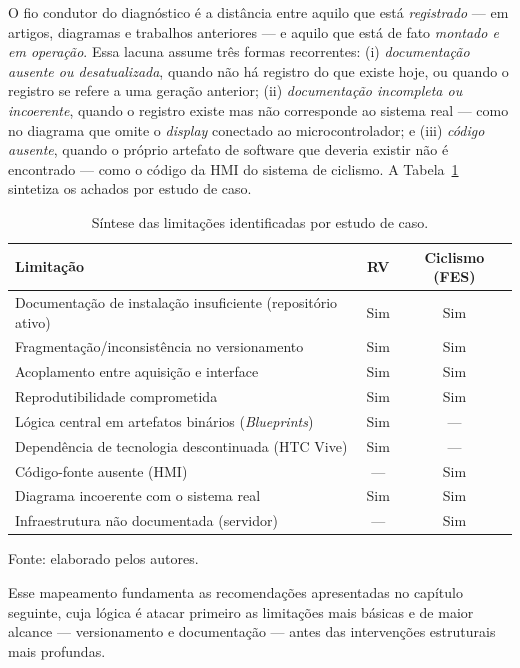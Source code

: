 O fio condutor do diagnóstico é a distância entre aquilo que está \emph{registrado} ---
em artigos, diagramas e trabalhos anteriores --- e aquilo que está de fato \emph{montado e
em operação}. Essa lacuna assume três formas recorrentes: (i) \emph{documentação ausente ou
desatualizada}, quando não há registro do que existe hoje, ou quando o registro se refere a
uma geração anterior; (ii) \emph{documentação incompleta ou incoerente}, quando o registro
existe mas não corresponde ao sistema real --- como no diagrama que omite o \emph{display}
conectado ao microcontrolador; e (iii) \emph{código ausente}, quando o próprio artefato de
software que deveria existir não é encontrado --- como o código da HMI do sistema de
ciclismo. A Tabela~\ref{tab:diagnostico} sintetiza os achados por estudo de caso.

\begin{table}[H]
	\centering
	\caption{Síntese das limitações identificadas por estudo de caso.}
	\label{tab:diagnostico}
	\begin{tabular}{p{6.2cm} c c}
		\hline
		\textbf{Limitação} & \textbf{RV} & \textbf{Ciclismo (FES)} \\
		\hline
		Documentação de instalação insuficiente (repositório ativo) & Sim & Sim \\
		Fragmentação/inconsistência no versionamento & Sim & Sim \\
		Acoplamento entre aquisição e interface & Sim & Sim \\
		Reprodutibilidade comprometida & Sim & Sim \\
		Lógica central em artefatos binários (\emph{Blueprints}) & Sim & --- \\
		Dependência de tecnologia descontinuada (HTC Vive) & Sim & --- \\
		Código-fonte ausente (HMI) & --- & Sim \\
		Diagrama incoerente com o sistema real & Sim & Sim \\
		Infraestrutura não documentada (servidor) & --- & Sim \\
		\hline
	\end{tabular}

	\vspace{4pt}
	{\footnotesize Fonte: elaborado pelos autores.}
\end{table}

Esse mapeamento fundamenta as recomendações apresentadas no capítulo seguinte, cuja lógica
é atacar primeiro as limitações mais básicas e de maior alcance --- versionamento e
documentação --- antes das intervenções estruturais mais profundas.
